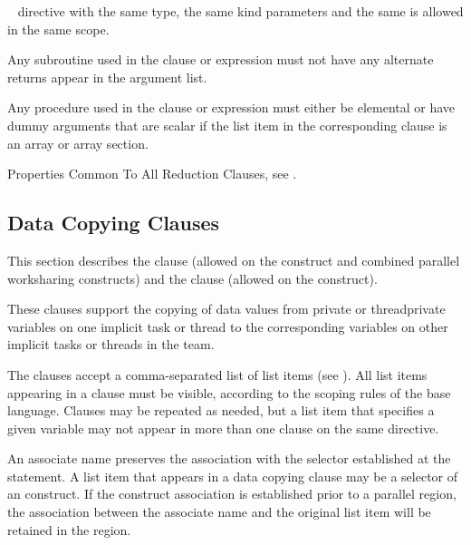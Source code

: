 \begin{itemize}
\begin{fortranspecific}
      ~ directive with the same type, the same 
      kind parameters and the same  is allowed in 
      the same scope.
\item Any subroutine used in the  clause or  
      expression must not have any alternate returns appear in the argument list.
\item Any procedure used in the  clause or 
      expression must either be elemental or have dummy arguments that
      are scalar if the list item in the corresponding
       clause is an array or array section.
\end{fortranspecific}
\end{itemize}

\begin{crossrefs}
\item Properties Common To All Reduction Clauses, see
.
\end{crossrefs}



\subsection{Data Copying Clauses}
\label{subsec:Data Copying Clauses}
This section describes the  clause (allowed on the  
construct and combined parallel worksharing constructs) and the  
clause (allowed on the  construct).

These clauses support the copying of data values from private or threadprivate 
variables on one implicit task or thread to the corresponding variables on other 
implicit tasks or threads in the team.

The clauses accept a comma-separated list of list items (see 
). All list items appearing in a clause must be 
visible, according to the scoping rules of the base language. Clauses may be 
repeated as needed, but a list item that specifies a given variable may not 
appear in more than one clause on the same directive.

\begin{fortranspecific}
An associate name preserves the association with the selector established at 
the  statement. A list item that appears in a data copying 
clause may be a selector of an  construct. If the construct 
association is established prior to a parallel region, the association between 
the associate name and the original list item will be retained in the region.
\end{fortranspecific}



